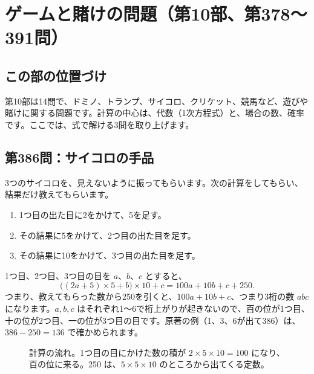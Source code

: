 \documentclass[a4paper,11pt,openany]{ltjsbook}
\begin{document}
\chapter{ゲームと賭けの問題（第10部、第378〜391問）}

\section{この部の位置づけ}

第10部は14問で、ドミノ、トランプ、サイコロ、クリケット、競馬など、遊びや賭けに関する問題です。計算の中心は、代数（1次方程式）と、場合の数、確率です。ここでは、式で解ける3問を取り上げます。

\section{第386問：サイコロの手品}

3つのサイコロを、見えないように振ってもらいます。次の計算をしてもらい、結果だけ教えてもらいます。

\begin{enumerate}[leftmargin=*]
\item 1つ目の出た目に2をかけて、5を足す。
\item その結果に5をかけて、2つ目の出た目を足す。
\item その結果に10をかけて、3つ目の出た目を足す。
\end{enumerate}

1つ目、2つ目、3つ目の目を $a$、$b$、$c$ とすると、
\[
\bigl((2a+5)\times5+b\bigr)\times10+c=100a+10b+c+250 .
\]
つまり、教えてもらった数から250を引くと、$100a+10b+c$、つまり3桁の数 $abc$ になります。$a,b,c$ はそれぞれ1〜6で桁上がりが起きないので、百の位が1つ目、十の位が2つ目、一の位が3つ目の目です。原著の例（1、3、6が出て386）は、$386-250=136$ で確かめられます。

\begin{figure}[htbp]
\centering
{}
\caption{計算の流れ。1つ目の目にかけた数の積が $2\times5\times10=100$ になり、百の位に来る。250 は、$5\times5\times10$ のところから出てくる定数。}
\end{figure}
\end{document}
